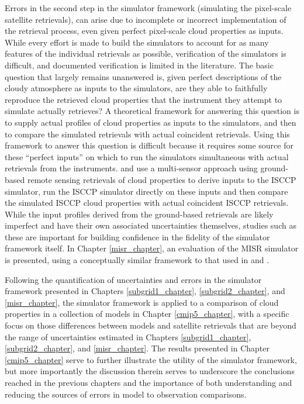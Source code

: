 Errors in the second step in the simulator framework (simulating the pixel-scale satellite retrievals), can arise due to incomplete or incorrect implementation of the retrieval process, even given perfect pixel-scale cloud properties as inputs. While every effort is made to build the simulators to account for as many features of the individual retrievals as possible, verification of the simulators is difficult, and documented verification is limited in the literature. The basic question that largely remains unanswered is, given perfect descriptions of the cloudy atmosphere as inputs to the simulators, are they able to faithfully reproduce the retrieved cloud properties that the instrument they attempt to simulate actually retrieves? A theoretical framework for answering this question is to supply actual profiles of cloud properties as inputs to the simulators, and then to compare the simulated retrievals with actual coincident retrievals. Using this framework to answer this question is difficult because it requires some source for these ``perfect inputs'' on which to run the simulators simultaneous with actual retrievals from the instruments. \cite{mace_et_al_2009} and \cite{mace_et_al_2011} use a multi-sensor approach using ground-based remote sensing retrievals of cloud properties to derive inputs to the ISCCP simulator, run the ISCCP simulator directly on these inputs and then compare the simulated ISCCP cloud properties with actual coincident ISCCP retrievals. While the input profiles derived from the ground-based retrievals are likely imperfect and have their own associated uncertainties themselves, studies such as these are important for building confidence in the fidelity of the simulator framework itself. In Chapter \ref{misr_chapter}, an evaluation of the MISR simulator is presented, using a conceptually similar framework to that used in \cite{mace_et_al_2009} and \cite{mace_et_al_2011}.

Following the quantification of uncertainties and errors in the simulator framework presented in Chapters \ref{subgrid1_chapter}, \ref{subgrid2_chapter}, and \ref{misr_chapter}, the simulator framework is applied to a comparison of cloud properties in a collection of models in Chapter \ref{cmip5_chapter}, with a specific focus on those differences between models and satellite retrievals that are beyond the range of uncertainties estimated in Chapters \ref{subgrid1_chapter}, \ref{subgrid2_chapter}, and \ref{misr_chapter}. The results presented in Chapter \ref{cmip5_chapter} serve to further illustrate the utility of the simulator framework, but more importantly the discussion therein serves to underscore the conclusions reached in the previous chapters and the importance of both understanding and reducing the sources of errors in model to observation comparisons.
